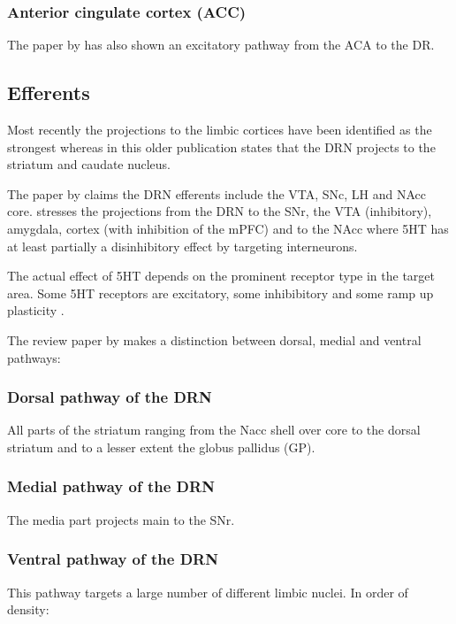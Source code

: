 \documentclass[12pt,a4paper]{article}
\begin{document}
\subsubsection{Anterior cingulate cortex (ACC)}
The paper by \citet{PollakDorocic2014} has also shown an excitatory
pathway from the ACA to the DR.

\subsection{Efferents}
Most recently the projections to the limbic cortices have been
identified as the strongest \citep{Linley2013} \citep{Roberts2011}
whereas in this older publication \citep{Reisine1984} states that the
DRN projects to the striatum and caudate nucleus.

The paper by \citep{Vertes2010} claims the DRN efferents include the
VTA, SNc, LH and NAcc core. \citep{Nakamura2013} stresses the
projections from the DRN to the SNr, the VTA (inhibitory), amygdala,
cortex (with inhibition of the mPFC) and to the NAcc where 5HT has at
least partially a disinhibitory effect by targeting interneurons.

The actual effect of 5HT depends on the prominent receptor type in the
target area. Some 5HT receptors are excitatory, some inhibibitory and
some ramp up plasticity \citep{Frazer1999}.

The review paper by \citet{Michelsen2007} makes a distinction between
dorsal, medial and ventral pathways:

\subsubsection{Dorsal pathway of the DRN}
All parts of the striatum ranging from the Nacc shell over core to the dorsal striatum
and to a lesser extent the globus pallidus (GP).

\subsubsection{Medial pathway of the DRN}
The media part projects main to the SNr.

\subsubsection{Ventral pathway of the DRN}
This pathway targets a large number of different limbic nuclei. In order of density:
\end{document}
